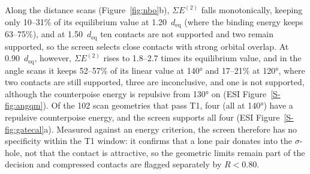 \documentclass[journal=jcisd8,manuscript=article,layout=two-column]{achemso}
\newcommand{\ET}{E^{(2)}}
\begin{document}
Along the distance scans (Figure~\ref{fig:nbo}b), $\Sigma\ET$ falls monotonically, keeping only 10--31\% of its equilibrium value at 1.20~$d_\mathrm{eq}$ (where the binding energy keeps 63--75\%), and at 1.50~$d_\mathrm{eq}$ ten contacts are not supported and two remain supported, so the screen selects close contacts with strong orbital overlap. At 0.90~$d_\mathrm{eq}$, however, $\Sigma\ET$ rises to 1.8--2.7 times its equilibrium value, and in the angle scans it keeps 52--57\% of its linear value at \ang{140} and 17--21\% at \ang{120}, where two contacts are still supported, three are inconclusive, and one is not supported, although the counterpoise energy is repulsive from \ang{130} on (ESI Figure~\ref{S-fig:angqm}). Of the 102 scan geometries that pass T1, four (all at \ang{140}) have a repulsive counterpoise energy, and the screen supports all four (ESI Figure~\ref{S-fig:gatecal}a). Measured against an energy criterion, the screen therefore has no specificity within the T1 window: it confirms that a lone pair donates into the $\sigma$-hole, not that the contact is attractive, so the geometric limits remain part of the decision and compressed contacts are flagged separately by $R < 0.80$.
\end{document}
